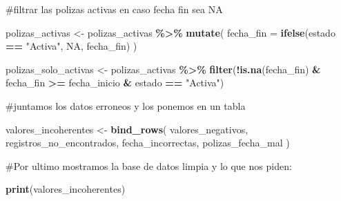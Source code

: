 \documentclass[
]{article}
\newenvironment{Shaded}{\begin{snugshade}}{\end{snugshade}}
\newcommand{\AttributeTok}[1]{\textcolor[rgb]{0.13,0.29,0.53}{#1}}
\newcommand{\ConstantTok}[1]{\textcolor[rgb]{0.56,0.35,0.01}{#1}}
\newcommand{\FunctionTok}[1]{\textcolor[rgb]{0.13,0.29,0.53}{\textbf{#1}}}
\newcommand{\NormalTok}[1]{#1}
\newcommand{\OtherTok}[1]{\textcolor[rgb]{0.56,0.35,0.01}{#1}}
\newcommand{\SpecialCharTok}[1]{\textcolor[rgb]{0.81,0.36,0.00}{\textbf{#1}}}
\newcommand{\StringTok}[1]{\textcolor[rgb]{0.31,0.60,0.02}{#1}}
\begin{document}
\#filtrar las polizas activas en caso fecha fin sea NA

\begin{Shaded}
\begin{Highlighting}[]
\NormalTok{polizas\_activas }\OtherTok{\textless{}{-}}\NormalTok{ polizas\_activas }\SpecialCharTok{\%\textgreater{}\%}
  \FunctionTok{mutate}\NormalTok{(}
    \AttributeTok{fecha\_fin =} \FunctionTok{ifelse}\NormalTok{(estado }\SpecialCharTok{==} \StringTok{"Activa"}\NormalTok{, }\ConstantTok{NA}\NormalTok{, fecha\_fin)}
\NormalTok{  )}

\NormalTok{polizas\_solo\_activas }\OtherTok{\textless{}{-}}\NormalTok{ polizas\_activas }\SpecialCharTok{\%\textgreater{}\%}
  \FunctionTok{filter}\NormalTok{(}\SpecialCharTok{!}\FunctionTok{is.na}\NormalTok{(fecha\_fin) }\SpecialCharTok{\&}\NormalTok{ fecha\_fin }\SpecialCharTok{\textgreater{}=}\NormalTok{ fecha\_inicio }\SpecialCharTok{\&}\NormalTok{ estado }\SpecialCharTok{==} \StringTok{"Activa"}\NormalTok{)}
\end{Highlighting}
\end{Shaded}

\#juntamos los datos erroneos y los ponemos en un tabla

\begin{Shaded}
\begin{Highlighting}[]
\NormalTok{valores\_incoherentes }\OtherTok{\textless{}{-}} \FunctionTok{bind\_rows}\NormalTok{(}
\NormalTok{  valores\_negativos,}
\NormalTok{  registros\_no\_encontrados,}
\NormalTok{  fecha\_incorrectas,}
\NormalTok{  polizas\_fecha\_mal}
\NormalTok{)}
\end{Highlighting}
\end{Shaded}

\#Por ultimo mostramos la base de datos limpia y lo que nos piden:

\begin{Shaded}
\begin{Highlighting}[]
\FunctionTok{print}\NormalTok{(valores\_incoherentes)}
\end{Highlighting}
\end{Shaded}
\end{document}
